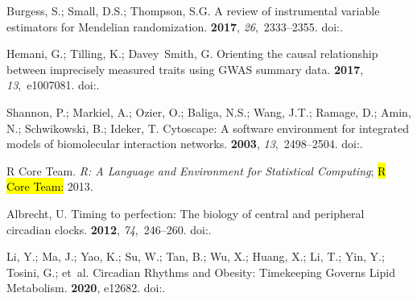 \documentclass[genes,article,accept,moreauthors,pdftex]{Definitions/mdpi}
\begin{document}
\begin{thebibliography}{999}
Burgess, S.; Small, D.S.; Thompson, S.G.
\newblock A review of instrumental variable estimators for {Mendelian}
  randomization.
 {\bf 2017}, {\em
  26},~2333--2355.
\newblock 
  doi:{\href{https://doi.org/10.1177/0962280215597579}{}}.

Hemani, G.; Tilling, K.; Davey~Smith, G.
\newblock Orienting the causal relationship between imprecisely measured traits
  using {GWAS} summary data.
 {\bf 2017}, {\em 13},~e1007081.
\newblock
  doi:{\href{https://doi.org/10.1371/journal.pgen.1007081}{}}.

Shannon, P.; Markiel, A.; Ozier, O.; Baliga, N.S.; Wang, J.T.; Ramage, D.;
  Amin, N.; Schwikowski, B.; Ideker, T.
\newblock Cytoscape: A software environment for integrated models of
  biomolecular interaction networks.
 {\bf 2003}, {\em 13},~2498--2504.
\newblock
  doi:{\href{https://doi.org/10.1101/gr.1239303}{}}.

{R Core Team}.
\newblock \emph{R: {A} Language and Environment for Statistical Computing}; \hl{R Core Team:} 2013.

Albrecht, U.
\newblock Timing to perfection: The biology of central and peripheral circadian
  clocks.
 {\bf 2012}, {\em 74},~246--260.
\newblock
  doi:{\href{https://doi.org/10.1016/j.neuron.2012.04.006}{}}.

Li, Y.; Ma, J.; Yao, K.; Su, W.; Tan, B.; Wu, X.; Huang, X.; Li, T.; Yin, Y.;
  Tosini, G.; et~al.
\newblock Circadian {Rhythms} and {Obesity}: {Timekeeping} {Governs} {Lipid}
  {Metabolism}.
 {\bf 2020}, e12682.
\newblock
  doi:{\href{https://doi.org/10.1111/jpi.12682}{}}.


\end{thebibliography}
\end{document}
